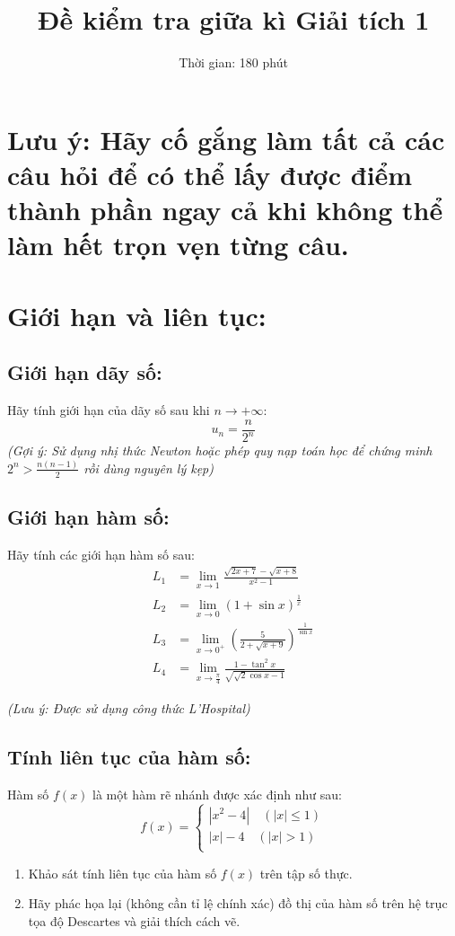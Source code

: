 \documentclass[9pt]{extarticle}
\title{Đề kiểm tra giữa kì Giải tích 1}
\author{Thời gian: 180 phút}
\begin{document}
\maketitle
\section*{Lưu ý: Hãy cố gắng làm tất cả các câu hỏi để có thể lấy được điểm thành phần ngay cả khi không thể làm hết trọn vẹn từng câu.}
\section{Giới hạn và liên tục:}
\subsection{Giới hạn dãy số:}
Hãy tính giới hạn của dãy số sau khi $n\to+\infty$:
$$u_{n}=\frac{n}{2^n}$$
\textit{(Gợi ý: Sử dụng nhị thức Newton hoặc phép quy nạp toán học để chứng minh $2^n>\frac{n(n-1)}{2}$ rồi dùng nguyên lý kẹp)}
\subsection{Giới hạn hàm số:}
Hãy tính các giới hạn hàm số sau:
\begin{equation*}
\begin{split}
L_{1}&=\lim_{x\to1}\frac{\sqrt{2x+7}-\sqrt{x+8}}{x^2-1}\\
L_{2}&=\lim_{x\to0}(1+\sin{x})^{\frac{1}{x}}\\
L_{3}&=\lim_{x\to0^{+}}\left(\frac{5}{2+\sqrt{x+9}}\right)^{\frac{1}{\sin{x}}}\\
L_{4}&=\lim_{x\to\frac{\pi}{4}}\frac{1-\tan^2{x}}{\sqrt{\sqrt{2}\cos{x}-1}}
\end{split}
\end{equation*}
\begin{center}
\textit{(Lưu ý: Được sử dụng công thức L'Hospital)}
\end{center}
\subsection{Tính liên tục của hàm số:}
Hàm số $f(x)$ là một hàm rẽ nhánh được xác định như sau:
\begin{equation*}
    f(x)=\left\{\begin{aligned}
        |x^2-4| \quad(|x|\leq1)\\
         |x|-4\quad(|x|>1)\\
    \end{aligned}\right.
\end{equation*}
\begin{enumerate}
    \item Khảo sát tính liên tục của hàm số $f(x)$ trên tập số thực.
    \item Hãy phác họa lại (không cần tỉ lệ chính xác) đồ thị của hàm số trên hệ trục tọa độ Descartes và giải thích cách vẽ.
\end{enumerate}
\end{document}
